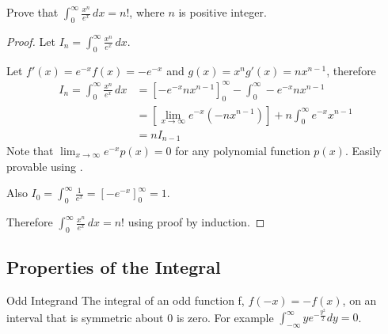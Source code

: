 \begin{exec}
  Prove that $\int_{0}^{\infty}\frac{x^n}{e^{x}}\,dx = n!$, where $n$ is positive integer.
  \tcblower
  \begin{proof}
  Let $I_n = \int_{0}^{\infty}\frac{x^n}{e^{x}}\,dx$.

  Let $f'(x)=e^{-x}$\g$f(x)=-e^{-x}$ and $g(x)=x^n$\g$g'(x)=nx^{n-1}$, therefore
  \begin{align*}
    I_n = \int_{0}^{\infty}\frac{x^n}{e^{x}}\,dx
      &= \left[-e^{-x}nx^{n-1}\right]^{\infty}_{0} - \int_{0}^{\infty}-e^{-x}nx^{n-1} \\
      &= \left[\lim_{x\rightarrow\infty}e^{-x}(-nx^{n-1})\right] + n\int_{0}^{\infty}e^{-x}x^{n-1} \\
      &= nI_{n-1}
  \end{align*}
  Note that $\lim_{x\rightarrow\infty}e^{-x}p(x)=0$ for any polynomial function $p(x)$. Easily provable using .

  Also $I_{0}=\int^{\infty}_{0}\frac{1}{e^x}=\left[-e^{-x}\right]^{\infty}_{0}=1$.

  Therefore $\int_{0}^{\infty}\frac{x^n}{e^{x}}\,dx=n!$ using proof by induction.
  \end{proof}
\end{exec}

\subsection{Properties of the Integral}

\begin{fact}{Odd Integrand}{}
  The integral of an odd function f, $f(-x)=-f(x)$, on an interval that is symmetric about 0 is zero. For example $\int_{-\infty}^{\infty} ye^{-\frac{y^2}{2}}dy=0$.
\end{fact}